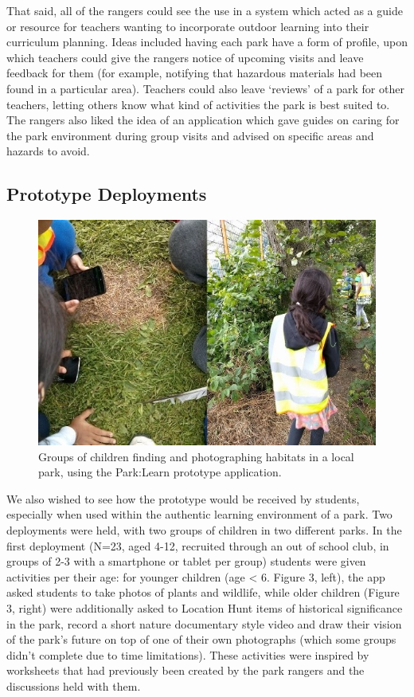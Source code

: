 That said, all of the rangers could see the use in a system which acted as a guide or resource for teachers wanting to incorporate outdoor learning into their curriculum planning. Ideas included having each park have a form of profile, upon which teachers could give the rangers notice of upcoming visits and leave feedback for them (for example, notifying that hazardous materials had been found in a particular area). Teachers could also leave `reviews' of a park for other teachers, letting others know what kind of activities the park is best suited to. The rangers also liked the idea of an application which gave guides on caring for the park environment during group visits and advised on specific areas and hazards to avoid.


\subsection{Prototype Deployments}

\begin{figure}
  \centering
  \includegraphics[width=0.8\columnwidth]{images/chapter04/prototypeDeployment.jpg}
  \caption{Groups of children finding and photographing habitats in a local park, using the Park:Learn prototype application.}
  \label{fig:prototypeDeployment}
\end{figure}

We also wished to see how the prototype would be received by students, especially when used within the authentic learning environment of a park. Two deployments were held, with two groups of children in two different parks. In the first deployment (N=23, aged 4-12, recruited through an out of school club, in groups of 2-3 with a smartphone or tablet per group) students were given activities per their age: for younger children (age < 6. Figure 3, left), the app asked students to take photos of plants and wildlife, while older children (Figure 3, right) were additionally asked to Location Hunt items of historical significance in the park, record a short nature documentary style video and draw their vision of the park’s future on top of one of their own photographs (which some groups didn’t complete due to time limitations). These activities were inspired by worksheets that had previously been created by the park rangers and the discussions held with them. 

